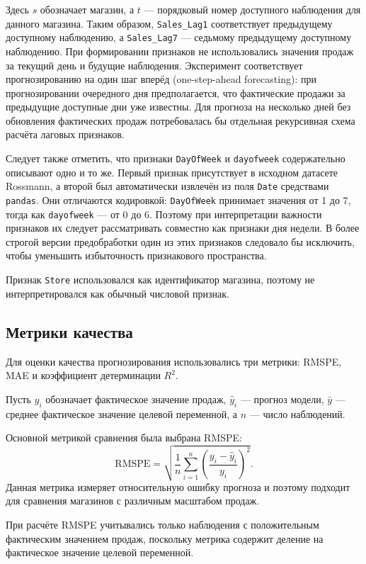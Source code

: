 \documentclass[12pt,a4paper]{article}
\numberwithin{equation}{section}
\begin{document}
Здесь \(s\) обозначает магазин, а \(t\) --- порядковый номер доступного наблюдения для данного магазина. Таким образом, \texttt{Sales\_Lag1} соответствует предыдущему доступному наблюдению, а \texttt{Sales\_Lag7} --- седьмому предыдущему доступному наблюдению. При формировании признаков не использовались значения продаж за текущий день и будущие наблюдения. Эксперимент соответствует прогнозированию на один шаг вперёд (one-step-ahead forecasting): при прогнозировании очередного дня предполагается, что фактические продажи за предыдущие доступные дни уже известны. Для прогноза на несколько дней без обновления фактических продаж потребовалась бы отдельная рекурсивная схема расчёта лаговых признаков.

Следует также отметить, что признаки \texttt{DayOfWeek} и \texttt{dayofweek} содержательно описывают одно и то же. Первый признак присутствует в исходном датасете Rossmann, а второй был автоматически извлечён из поля \texttt{Date} средствами \texttt{pandas}. Они отличаются кодировкой: \texttt{DayOfWeek} принимает значения от 1 до 7, тогда как \texttt{dayofweek} --- от 0 до 6. Поэтому при интерпретации важности признаков их следует рассматривать совместно как признаки дня недели. В более строгой версии предобработки один из этих признаков следовало бы исключить, чтобы уменьшить избыточность признакового пространства.

Признак \texttt{Store} использовался как идентификатор магазина, поэтому не интерпретировался как обычный числовой признак.

\subsection{Метрики качества}
Для оценки качества прогнозирования использовались три метрики: RMSPE, MAE и коэффициент детерминации \(R^2\).

Пусть \(y_i\) обозначает фактическое значение продаж, \(\hat{y}_i\) --- прогноз модели, \(\bar{y}\) --- среднее фактическое значение целевой переменной, а \(n\) --- число наблюдений.

Основной метрикой сравнения была выбрана RMSPE:
\[
\mathrm{RMSPE} = \sqrt{\frac{1}{n}\sum_{i=1}^{n}\left(\frac{y_i - \hat{y}_i}{y_i}\right)^2}.
\]
Данная метрика измеряет относительную ошибку прогноза и поэтому подходит для сравнения магазинов с различным масштабом продаж.

При расчёте RMSPE учитывались только наблюдения с положительным фактическим значением продаж, поскольку метрика содержит деление на фактическое значение целевой переменной.
\end{document}

